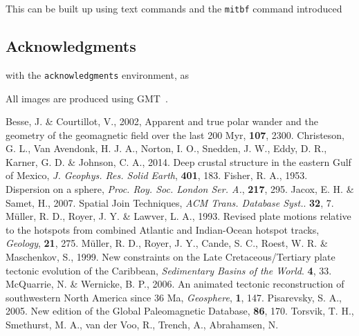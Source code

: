 This can be built up using text commands and the \verb"mitbf" command introduced

\subsection{Acknowledgments}
with the \texttt{acknowledgments} environment, as

\begin{acknowledgments}
All images are produced using GMT~\cite{W13}.
\end{acknowledgments}

\begin{thebibliography}{}
  Besse, J. \& Courtillot, V., 2002, Apparent and true polar wander and the
  geometry of the geomagnetic field over the last 200 Myr, \jgr{}\textbf{107},
  2300.
  Christeson, G. L., Van Avendonk, H. J. A., Norton, I. O., Snedden, J. W.,
  Eddy, D. R., Karner, G. D. \& Johnson, C. A., 2014. Deep crustal structure in
  the eastern Gulf of Mexico, \textit{J. Geophys. Res. Solid Earth},
  \textbf{401}, 183.
  Fisher, R. A., 1953. Dispersion on a sphere, \textit{Proc. Roy. Soc. London
  Ser. A.}, \textbf{217}, 295.
  Jacox, E. H. \& Samet, H., 2007. Spatial Join Techniques, \textit{ACM Trans.
  Database Syst.}. \textbf{32}, 7.
  M{\"{u}}ller, R. D., Royer, J. Y. \& Lawver, L. A., 1993. Revised plate
  motions relative to the hotspots from combined Atlantic and Indian-Ocean
  hotspot tracks, \textit{Geology}, \textbf{21}, 275.
  M{\"{u}}ller, R. D., Royer, J. Y., Cande, S. C., Roest, W. R. \& Maschenkov,
  S., 1999. New constraints on the Late Cretaceous/Tertiary plate tectonic
  evolution of the Caribbean, \textit{Sedimentary Basins of the World}.
  \textbf{4}, 33.
  McQuarrie, N. \& Wernicke, B. P., 2006. An animated tectonic reconstruction of
  southwestern North America since 36 Ma, \textit{Geosphere}, \textbf{1},
  147.
  Pisarevsky, S. A., 2005. New edition of the Global Paleomagnetic Database,
  \eos{}\textbf{86}, 170.
  Torsvik, T. H., Smethurst, M. A., van der Voo, R., Trench, A., Abrahamsen, N.

\end{thebibliography}
